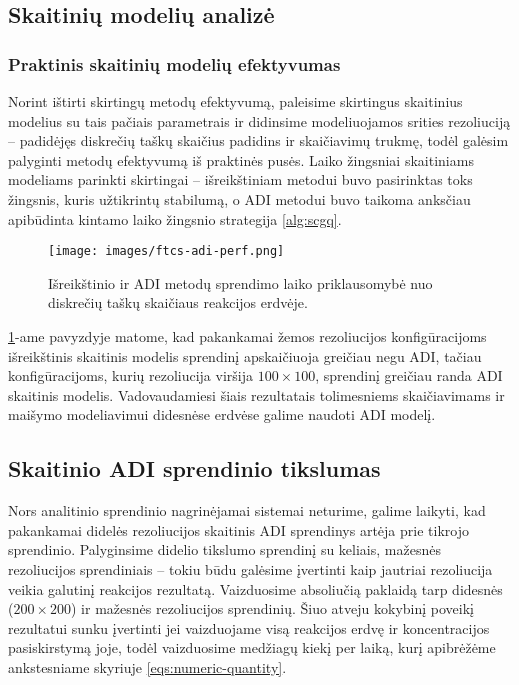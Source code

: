 \subsection{Skaitinių modelių analizė}


\subsubsection*{Praktinis skaitinių modelių efektyvumas}

Norint ištirti skirtingų metodų efektyvumą, paleisime skirtingus skaitinius modelius su tais pačiais parametrais ir didinsime modeliuojamos srities rezoliuciją -- padidėjęs diskrečių taškų skaičius padidins ir skaičiavimų trukmę, todėl galėsim palyginti metodų efektyvumą iš praktinės pusės. Laiko žingsniai skaitiniams modeliams parinkti skirtingai -- išreikštiniam metodui buvo pasirinktas toks žingsnis, kuris užtikrintų stabilumą, o ADI metodui buvo taikoma anksčiau apibūdinta kintamo laiko žingsnio strategija \eqref{alg:scgq}.

\begin{figure}[h!]
  \centering
  \texttt{[image: images/ftcs-adi-perf.png]}
  \caption{Išreikštinio ir ADI metodų sprendimo laiko priklausomybė nuo diskrečių taškų skaičiaus reakcijos erdvėje.}
  \label{fig:adi-ftcs-solve-time-comparison}
\end{figure}

\ref{fig:adi-ftcs-solve-time-comparison}-ame pavyzdyje matome, kad pakankamai žemos rezoliucijos konfigūracijoms išreikštinis skaitinis modelis sprendinį apskaičiuoja greičiau negu ADI, tačiau konfigūracijoms, kurių rezoliucija viršija $100\times100$, sprendinį greičiau randa ADI skaitinis modelis. Vadovaudamiesi šiais rezultatais tolimesniems skaičiavimams ir maišymo modeliavimui didesnėse erdvėse galime naudoti ADI modelį.

\subsection*{Skaitinio ADI sprendinio tikslumas}

Nors analitinio sprendinio nagrinėjamai sistemai neturime, galime laikyti, kad pakankamai didelės rezoliucijos skaitinis ADI sprendinys artėja prie tikrojo sprendinio. Palyginsime didelio tikslumo sprendinį su keliais, mažesnės rezoliucijos sprendiniais -- tokiu būdu galėsime įvertinti kaip jautriai rezoliucija veikia galutinį reakcijos rezultatą. Vaizduosime absoliučią paklaidą tarp didesnės ($200\times200$) ir mažesnės rezoliucijos sprendinių. Šiuo atveju kokybinį poveikį rezultatui sunku įvertinti jei vaizduojame visą reakcijos erdvę ir koncentracijos pasiskirstymą joje, todėl vaizduosime medžiagų kiekį per laiką, kurį apibrėžėme ankstesniame skyriuje \eqref{eqs:numeric-quantity}.

